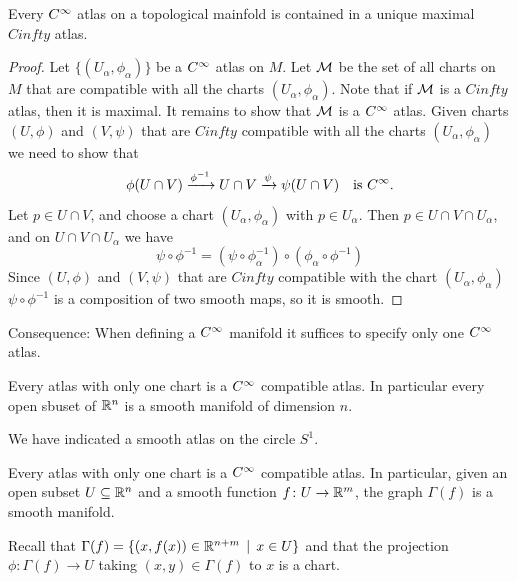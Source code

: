 \begin{frame}
  \begin{prop}
    Every $C^{\infty}$ atlas on a topological mainfold is contained 
    in a unique maximal $Cinfty$ atlas.
  \end{prop}
  \begin{proof}
    Let $\{(U_\alpha, \phi_\alpha)\}$
    be a $C^{\infty}$ atlas on $M$.
    Let $\mathcal M$ be the set of all charts on $M$ that are compatible with
    all the charts 
    $(U_\alpha, \phi_\alpha)$.
    Note that if  $\mathcal M$ is a $Cinfty$ atlas, then it is maximal.
    It remains to show that $\mathcal M$ is a $C^{\infty}$ atlas.
    Given charts $(U, \phi)$ and $(V,\psi)$ that are $Cinfty$
    compatible with all the charts
    $(U_\alpha, \phi_\alpha)$
    we need to show that 
    \begin{displaymath}
      \phi(U \cap V) \xrightarrow {\phi^{-1}} U \cap V \xrightarrow \psi \psi(U \cap V)
      \quad \text{is $C^{\infty}$.}
    \end{displaymath}
    Let $p \in U \cap V$, and choose a chart 
    $(U_\alpha, \phi_\alpha)$
    with $p \in U_\alpha$.
    Then $p \in U \cap V \cap U_{\alpha}$, and on
    $U \cap V \cap U_{\alpha}$ we have 
    \begin{displaymath}
      \psi \circ \phi^{-1} = (\psi \circ \phi_{\alpha}^{-1}) \circ (\phi_\alpha
      \circ \phi^{-1})
    \end{displaymath}
    Since $(U, \phi)$ and $(V,\psi)$ that are $Cinfty$
    compatible with the chart
    $(U_\alpha, \phi_\alpha)$
    $\psi \circ \phi^{-1}$ is a composition of two smooth maps,
    so it is smooth.
  \end{proof}
  Consequence: When defining a $C^{\infty}$ manifold it suffices to 
  specify only one $C^{\infty}$ atlas.
\end{frame}
\begin{frame}
  \begin{example}
    Every atlas with only one chart is a $C^{\infty}$ compatible atlas.
    In particular every open sbuset of $\mathbb R^n$ is a smooth manifold
    of dimension $n$.
  \end{example}
  \begin{example}
    We have indicated a smooth atlas on the circle $S^1$.
  \end{example}
  \begin{example}
    Every atlas with only one chart is a $C^{\infty}$ compatible atlas.
    In particular, given an open subset $U \subseteq \mathbb R^n$ and a
    smooth function $f \colon U \to \mathbb R^m$, the graph $\Gamma(f)$
    is a smooth manifold.
  \end{example}
  Recall that $\Gamma(f) = \{(x, f(x)) \in \mathbb R^{n+m} \, \mid \, x \in U\}$ and that
  the projection $\phi \colon \Gamma(f) \to U$ taking $(x, y) \in \Gamma(f)$ to
  $x$ is a chart.
\end{frame}
